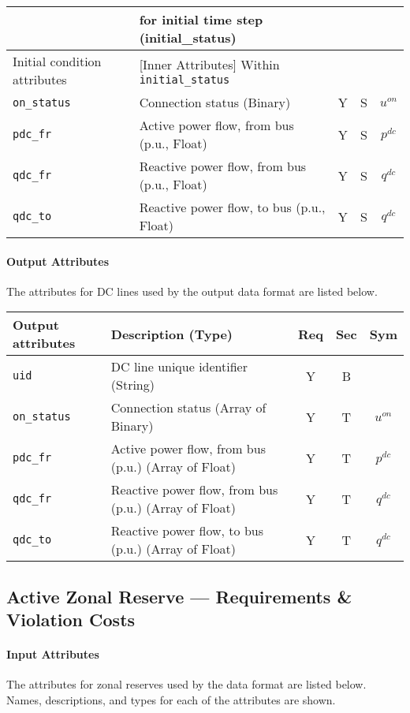 \documentclass{article}
\begin{document}
\begin{center}
\begin{tabular}{ l | l | c | c | c |}
       & for initial time step (initial\_status) &  &  &  \\
  \hline
  Initial condition attributes & [Inner Attributes] Within {\tt initial\_status} & & & \\
  \hline
  {\tt on\_status} & Connection status (Binary) & Y & S & $u^{on}$ \\
  {\tt pdc\_fr} & Active power flow, from bus (p.u., Float)& Y & S & $p^{dc}$ \\
  {\tt qdc\_fr} & Reactive power flow, from bus (p.u., Float)& Y & S & $q^{dc}$ \\
  {\tt qdc\_to} & Reactive power flow, to bus (p.u., Float)& Y & S & $q^{dc}$ \\
  \hline
\end{tabular}
\end{center}

\paragraph{Output Attributes}
 The attributes for DC lines
 used by the output data format are listed below.
\begin{center}
\small
\begin{tabular}{ l | l | c | c | c | }
Output attributes & Description (Type) & Req & Sec & Sym\\
\hline
  {\tt uid}    & DC line unique identifier (String)& Y & B & \\
  {\tt on\_status} & Connection status (Array of Binary) & Y & T & $u^{on}$ \\
  {\tt pdc\_fr} & Active power flow, from bus (p.u.) (Array of Float)& Y & T & $p^{dc}$ \\
  {\tt qdc\_fr} & Reactive power flow, from bus (p.u.) (Array of Float)& Y & T & $q^{dc}$ \\
  {\tt qdc\_to} & Reactive power flow, to bus (p.u.) (Array of Float)& Y & T & $q^{dc}$ \\
  \hline
\end{tabular}
\end{center}

\subsection{Active Zonal Reserve ---  Requirements \& Violation Costs}
\label{nom:reserves_active}

\paragraph{Input Attributes}
The attributes for zonal reserves
used by the data format are listed below.
Names, descriptions, and types for each of the attributes are shown.
\end{document}
